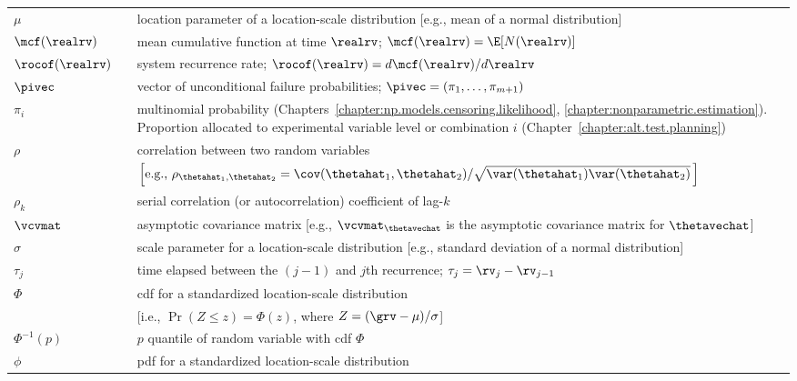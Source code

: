 \begin{supertabular}{p{0.9in}lp{4.0in}}
$\mu$       & 
&location parameter of a location-scale distribution 
[e.g., mean of a normal distribution]
    \\
$\mcf(\realrv)$       & 
&
mean cumulative function at time 
$\realrv$; $\mcf(\realrv)=\E[N(\realrv)]$
   \\
$\rocof(\realrv)$       & 
&
system recurrence rate;
$\rocof(\realrv)=d \mcf(\realrv)/d \realrv$
   \\
$\pivec$ &
&vector of unconditional failure probabilities;
$\pivec=(\pi_{1}, \ldots, \pi_{m+1})$ 
   \\
$\pi_{i}$ &
&multinomial probability 
(Chapters~\ref{chapter:np.models.censoring.likelihood},
\ref{chapter:nonparametric.estimation}).
Proportion allocated to experimental variable 
level or combination $i$ (Chapter~\ref{chapter:alt.test.planning})
    \\
$\rho$ &
&correlation between two random variables\\
&&$ \left [\mbox{e.g.,} \,\,\rho_{\thetahat_{1},\thetahat_{2}}=
\cov(\thetahat_{1},\thetahat_{2})/
\sqrt{\var(\thetahat_{1}) \var(\thetahat_{2})} \,
  \right ]$
   \\
$\rho_{k}$ &
&serial correlation (or autocorrelation) coefficient
of lag-$k$
     \\
$\vcvmat$ & 
&asymptotic covariance matrix [e.g.,
$\vcvmat_{\thetavechat}$ is the asymptotic
covariance matrix for $\thetavechat$]
   \\
$\sigma $   & 
&scale parameter for a location-scale distribution
[e.g., standard deviation of a normal distribution]
\\
$\tau_{j}$ &
&time elapsed between  the $(j-1)$ and $j$th
recurrence;
$\tau_{j}=\rv_{j}-\rv_{j-1}$
   \\
$\Phi$      & 
&cdf for a standardized location-scale distribution \\
            &
&[i.e., $\Pr(Z \le z)=\Phi(z)$, where $Z=(\grv-\mu)/\sigma$]
   \\
$\Phi^{-1}(p)$      & 
& $p$ quantile  of random variable with
cdf $\Phi$
  \\
$\phi$      & 
&pdf for a standardized location-scale distribution 
   \\ 

\end{supertabular}
